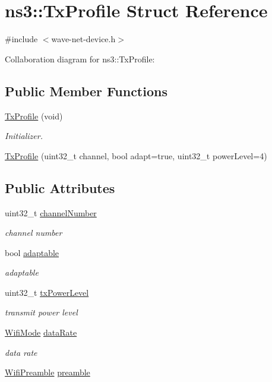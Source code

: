 \hypertarget{structns3_1_1TxProfile}{}\section{ns3\+:\+:Tx\+Profile Struct Reference}
\label{structns3_1_1TxProfile}


{\ttfamily \#include $<$wave-\/net-\/device.\+h$>$}



Collaboration diagram for ns3\+:\+:Tx\+Profile\+:
\subsection*{Public Member Functions}
\begin{DoxyCompactItemize}
\item 
\hyperlink{structns3_1_1TxProfile_ac55823a93233b0336d3a66e4bad03ba2}{Tx\+Profile} (void)
\begin{DoxyCompactList}\small\item\em Initializer. \end{DoxyCompactList}\item 
\hyperlink{structns3_1_1TxProfile_af2ed7ac964d88dc109d2064259560a50}{Tx\+Profile} (uint32\+\_\+t channel, bool adapt=true, uint32\+\_\+t power\+Level=4)
\end{DoxyCompactItemize}
\subsection*{Public Attributes}
\begin{DoxyCompactItemize}
\item 
uint32\+\_\+t \hyperlink{structns3_1_1TxProfile_a6ee2354a51951ca34dfbec1677f6bfa3}{channel\+Number}
\begin{DoxyCompactList}\small\item\em channel number \end{DoxyCompactList}\item 
bool \hyperlink{structns3_1_1TxProfile_a5ab1a6b737ba020a12498afabefa68f8}{adaptable}
\begin{DoxyCompactList}\small\item\em adaptable \end{DoxyCompactList}\item 
uint32\+\_\+t \hyperlink{structns3_1_1TxProfile_a194d9d200726947b1878974701b88ee6}{tx\+Power\+Level}
\begin{DoxyCompactList}\small\item\em transmit power level \end{DoxyCompactList}\item 
\hyperlink{classns3_1_1WifiMode}{Wifi\+Mode} \hyperlink{structns3_1_1TxProfile_a28ed5bf9dd2e23cd6b04be7deb7e320a}{data\+Rate}
\begin{DoxyCompactList}\small\item\em data rate \end{DoxyCompactList}\item 
\hyperlink{group__wifi_ga5e94a56cb338a14ffbbb19c6a41251eb}{Wifi\+Preamble} \hyperlink{structns3_1_1TxProfile_a2a3b9303ef59326971fe7d158656adb6}{preamble}
\end{DoxyCompactItemize}


